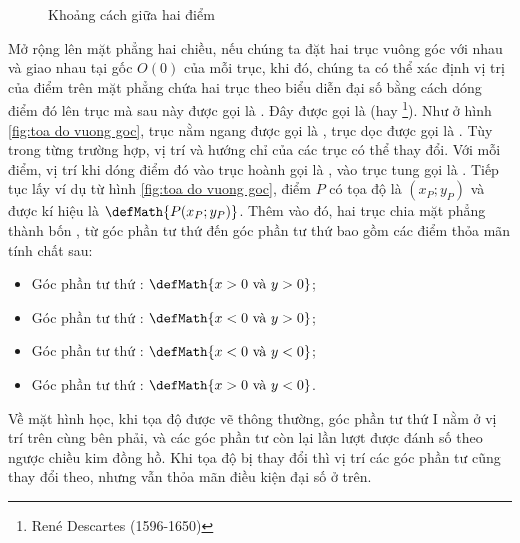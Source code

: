 \begin{figure}[H]
\begin{minipage}[b]{0.48\textwidth}
      \caption{Khoảng cách giữa hai điểm}
      \label{fig:khoang cach 2d}
   \end{minipage}
\end{figure}


Mở rộng lên mặt phẳng hai chiều, nếu chúng ta đặt hai trục vuông góc với nhau và giao nhau tại gốc $O(0)$ của mỗi trục, khi đó, chúng ta có thể xác định vị trị của điểm trên mặt phẳng chứa hai trục theo biểu diễn đại số bằng cách dóng điểm đó lên trục mà sau này được gọi là . Đây được gọi là  (hay \footnote{René Descartes (1596-1650)}). Như ở hình \ref{fig:toa do vuong goc}, trục nằm ngang được gọi là , trục dọc được gọi là . Tùy trong từng trường hợp, vị trí và hướng chỉ của các trục có thể thay đổi. Với mỗi điểm, vị trí khi dóng điểm đó vào trục hoành gọi là , vào trục tung gọi là . Tiếp tục lấy ví dụ từ hình \ref{fig:toa do vuong goc}, điểm $P$ có tọa độ là $(x_P;y_P)$ và được kí hiệu là $\defMath{P(x_P;y_P)}$. Thêm vào đó, hai trục chia mặt phẳng thành bốn , từ góc phần tư thứ  đến góc phần tư thứ  bao gồm các điểm thỏa mãn tính chất sau:
\begin{itemize}
   \item Góc phần tư thứ : $\defMath{x>0 \text{ và } y>0}$;
   \item Góc phần tư thứ : $\defMath{x<0 \text{ và } y>0}$;
   \item Góc phần tư thứ : $\defMath{x<0 \text{ và } y<0}$;
   \item Góc phần tư thứ : $\defMath{x>0 \text{ và } y<0}$.
\end{itemize}
Về mặt hình học, khi tọa độ được vẽ thông thường, góc phần tư thứ I nằm ở vị trí trên cùng bên phải, và các góc phần tư còn lại lần lượt được đánh số theo ngược chiều kim đồng hồ. Khi tọa độ bị thay đổi thì vị trí các góc phần tư cũng thay đổi theo, nhưng vẫn thỏa mãn điều kiện đại số ở trên. 

